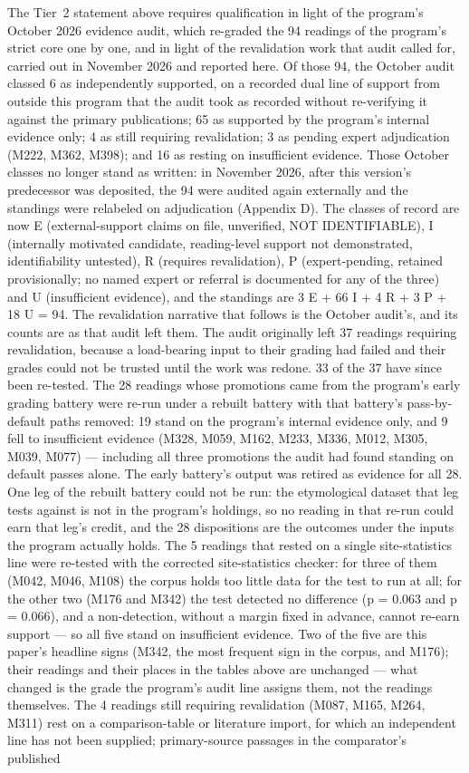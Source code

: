 \documentclass[11pt]{article}
\begin{document}
The Tier~2 statement above requires qualification in light of the program's October 2026 evidence audit, which re-graded the 94 readings of the program's strict core one by one, and in light of the revalidation work that audit called for, carried out in November 2026 and reported here. Of those 94, the October audit classed 6 as independently supported, on a recorded dual line of support from outside this program that the audit took as recorded without re-verifying it against the primary publications; 65 as supported by the program's internal evidence only; 4 as still requiring revalidation; 3 as pending expert adjudication (M222, M362, M398); and 16 as resting on insufficient evidence. Those October classes no longer stand as written: in November 2026, after this version's predecessor was deposited, the 94 were audited again externally and the standings were relabeled on adjudication (Appendix D). The classes of record are now E (external-support claims on file, unverified, NOT IDENTIFIABLE), I (internally motivated candidate, reading-level support not demonstrated, identifiability untested), R (requires revalidation), P (expert-pending, retained provisionally; no named expert or referral is documented for any of the three) and U (insufficient evidence), and the standings are 3 E + 66 I + 4 R + 3 P + 18 U = 94. The revalidation narrative that follows is the October audit's, and its counts are as that audit left them. The audit originally left 37 readings requiring revalidation, because a load-bearing input to their grading had failed and their grades could not be trusted until the work was redone. 33 of the 37 have since been re-tested. The 28 readings whose promotions came from the program's early grading battery were re-run under a rebuilt battery with that battery's pass-by-default paths removed: 19 stand on the program's internal evidence only, and 9 fell to insufficient evidence (M328, M059, M162, M233, M336, M012, M305, M039, M077) --- including all three promotions the audit had found standing on default passes alone. The early battery's output was retired as evidence for all 28. One leg of the rebuilt battery could not be run: the etymological dataset that leg tests against is not in the program's holdings, so no reading in that re-run could earn that leg's credit, and the 28 dispositions are the outcomes under the inputs the program actually holds. The 5 readings that rested on a single site-statistics line were re-tested with the corrected site-statistics checker: for three of them (M042, M046, M108) the corpus holds too little data for the test to run at all; for the other two (M176 and M342) the test detected no difference (p = 0.063 and p = 0.066), and a non-detection, without a margin fixed in advance, cannot re-earn support --- so all five stand on insufficient evidence. Two of the five are this paper's headline signs (M342, the most frequent sign in the corpus, and M176); their readings and their places in the tables above are unchanged --- what changed is the grade the program's audit line assigns them, not the readings themselves. The 4 readings still requiring revalidation (M087, M165, M264, M311) rest on a comparison-table or literature import, for which an independent line has not been supplied; primary-source passages in the comparator's published 
\end{document}
